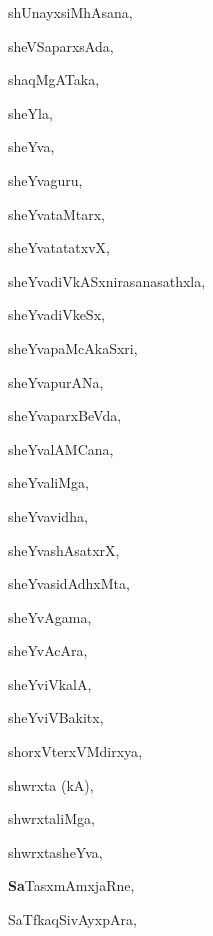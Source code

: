 \begin{multicols}{3}
{\noindent
{shUnayxsiMhAsana}, \pageref{shUnayxsiMhAsana}

\noindent
{sheVSaparxsAda}, \pageref{sheVSaparxsAda}

\noindent
{shaqMgATaka}, \pageref{shaqMgATaka}

\noindent
{sheYla}, \pageref{sheYla}

\noindent
{sheYva}, \pageref{sheYva}

\noindent
{sheYvaguru}, \pageref{sheYvaguru}

\noindent
{sheYvataMtarx}, \pageref{sheYvataMtarx}

\noindent
{sheYvatatatxvX}, \pageref{sheYvatatatxvX}

\noindent
{sheYvadiVkASxnirasanasathxla}, \pageref{sheYvadiVkASxnirasanasathxla}

\noindent
{sheYvadiVkeSx}, \pageref{sheYvadiVkeSx}

\noindent
{sheYvapaMcAkaSxri}, \pageref{sheYvapaMcAkaSxri}

\noindent
{sheYvapurANa}, \pageref{sheYvapurANa}

\noindent
{sheYvaparxBeVda}, \pageref{sheYvaparxBeVda}

\noindent
{sheYvalAMCana}, \pageref{sheYvalAMCana}

\noindent
{sheYvaliMga}, \pageref{sheYvaliMga}

\noindent
{sheYvavidha}, \pageref{sheYvavidha}

\noindent
{sheYvashAsatxrX}, \pageref{sheYvashAsatxrX}

\noindent
{sheYvasidAdhxMta}, \pageref{sheYvasidAdhxMta}

\noindent
{sheYvAgama}, \pageref{sheYvAgama}

\noindent
{sheYvAcAra}, \pageref{sheYvAcAra}

\noindent
{sheYviVkalA}, \pageref{sheYviVkalA}

\noindent
{sheYviVBakitx}, \pageref{sheYviVBakitx}

\noindent
{shorxVterxVMdirxya}, \pageref{shorxVterxVMdirxya}

\noindent
{shwrxta (kA)}, \pageref{shwrxtakA}

\noindent
{shwrxtaliMga}, \pageref{shwrxtaliMga}

\noindent
{shwrxtasheYva}, \pageref{shwrxtasheYva}

\noindent
{{\large\textbf{Sa}}TasxmAmxjaRne}, \pageref{SaTasxmAmxjaRne}

\noindent
{SaTfkaqSivAyxpAra}, \pageref{SaTfkaqSivAyxpAra}

}
\end{multicols}
